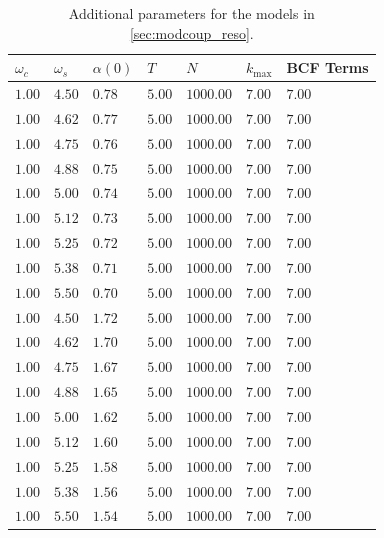 \begin{table}[H]
  \centering
  \begin{tabular}{lllllll}
  \hline
   $ω_c$   & $ω_s$   & $α(0)$   & $T$    & $N$       & $k_{\mathrm{max}}$   & BCF Terms   \\
  \hline
   $1.00$  & $4.50$  & $0.78$   & $5.00$ & $1000.00$ & $7.00$               & $7.00$      \\
   $1.00$  & $4.62$  & $0.77$   & $5.00$ & $1000.00$ & $7.00$               & $7.00$      \\
   $1.00$  & $4.75$  & $0.76$   & $5.00$ & $1000.00$ & $7.00$               & $7.00$      \\
   $1.00$  & $4.88$  & $0.75$   & $5.00$ & $1000.00$ & $7.00$               & $7.00$      \\
   $1.00$  & $5.00$  & $0.74$   & $5.00$ & $1000.00$ & $7.00$               & $7.00$      \\
   $1.00$  & $5.12$  & $0.73$   & $5.00$ & $1000.00$ & $7.00$               & $7.00$      \\
   $1.00$  & $5.25$  & $0.72$   & $5.00$ & $1000.00$ & $7.00$               & $7.00$      \\
   $1.00$  & $5.38$  & $0.71$   & $5.00$ & $1000.00$ & $7.00$               & $7.00$      \\
   $1.00$  & $5.50$  & $0.70$   & $5.00$ & $1000.00$ & $7.00$               & $7.00$      \\
   $1.00$  & $4.50$  & $1.72$   & $5.00$ & $1000.00$ & $7.00$               & $7.00$      \\
   $1.00$  & $4.62$  & $1.70$   & $5.00$ & $1000.00$ & $7.00$               & $7.00$      \\
   $1.00$  & $4.75$  & $1.67$   & $5.00$ & $1000.00$ & $7.00$               & $7.00$      \\
   $1.00$  & $4.88$  & $1.65$   & $5.00$ & $1000.00$ & $7.00$               & $7.00$      \\
   $1.00$  & $5.00$  & $1.62$   & $5.00$ & $1000.00$ & $7.00$               & $7.00$      \\
   $1.00$  & $5.12$  & $1.60$   & $5.00$ & $1000.00$ & $7.00$               & $7.00$      \\
   $1.00$  & $5.25$  & $1.58$   & $5.00$ & $1000.00$ & $7.00$               & $7.00$      \\
   $1.00$  & $5.38$  & $1.56$   & $5.00$ & $1000.00$ & $7.00$               & $7.00$      \\
   $1.00$  & $5.50$  & $1.54$   & $5.00$ & $1000.00$ & $7.00$               & $7.00$      \\
  \hline
  \end{tabular}
  \caption{\label{tab:plus_tune}Additional parameters for the models in
     \cref{sec:modcoup_reso}.}
\end{table}
